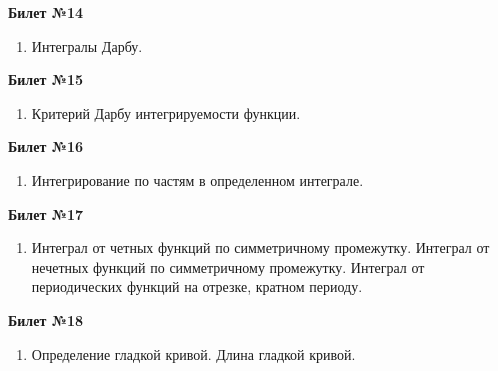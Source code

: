 \documentclass[a4paper, 12pt]{article}
\begin{document}
\begin{center}
	\textbf{Билет №14}
\end{center}
\begin{enumerate}
	\item Интегралы Дарбу.
\end{enumerate}

\begin{center}
	\textbf{Билет №15}
\end{center}
\begin{enumerate}
	\item Критерий Дарбу интегрируемости функции.
\end{enumerate}

\begin{center}
	\textbf{Билет №16}
\end{center}
\begin{enumerate}
	\item Интегрирование по частям в определенном интеграле.
\end{enumerate}

\begin{center}
	\textbf{Билет №17}
\end{center}
\begin{enumerate}
	\item Интеграл от четных функций по симметричному промежутку.
	Интеграл от нечетных функций по симметричному промежутку.
	Интеграл от периодических функций на отрезке, кратном периоду.
\end{enumerate}

\begin{center}
	\textbf{Билет №18}
\end{center}
\begin{enumerate}
	\item Определение гладкой кривой. Длина гладкой кривой.
\end{enumerate}
\end{document}
